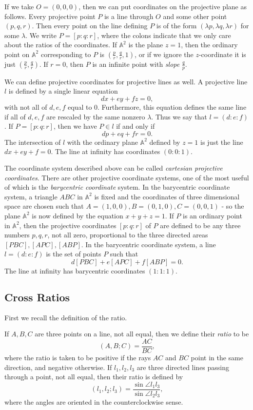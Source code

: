 If we take $O = (0,0,0)$, then we can put coordinates on the projective plane as follows. Every projective point $P$ is a line through $O$ and some other point $(p,q,r)$. Then every point on the line defining $P$ is of the form $(\lambda p,\lambda q,\lambda r)$ for some $\lambda$. We write $P = [p:q:r]$, where the colons indicate that we only care about the ratios of the coordinates. If $\mathbb{A}^2$ is the plane $z=1$, then the ordinary point on $\mathbb{A}^2$ corresponding to $P$ is $(\frac{p}{r},\frac{q}{r},1)$, or if we ignore the $z$-coordinate it is just $(\frac{p}{r},\frac{q}{r})$. If $r = 0$, then $P$ is an infinite point with \emph{slope} $\frac{q}{p}$.

We can define projective coordinates for projective lines as well. A projective line $l$ is defined by a single linear equation
\[
dx+ey+fz = 0,
\]
with not all of $d,e,f$ equal to $0$. Furthermore, this equation defines the same line if all of $d,e,f$ are rescaled by the same nonzero $\lambda$. Thus we say that $l = (d:e:f)$. If $P = [p:q:r]$, then we have $P\in l$ if and only if
\[
dp + eq+ fr = 0.
\]
The intersection of $l$ with the ordinary plane $\mathbb{A}^2$ defined by $z=1$ is just the line $dx+ey+f=0$. The line at infinity has coordinates $(0:0:1)$.

The coordinate system described above can be called \emph{cartesian projective coordinates}. There are other projective coordinate systems, one of the most useful of which is the \emph{barycentric coordinate} system. In the barycentric coordinate system, a triangle $ABC$ in $\mathbb{A}^2$ is fixed and the coordinates of three dimensional space are chosen such that $A=(1,0,0), B = (0,1,0), C = (0,0,1)$ - so the plane $\mathbb{A}^2$ is now defined by the equation $x+y+z = 1$. If $P$ is an ordinary point in $\mathbb{A}^2$, then the projective coordinates $[p:q:r]$ of $P$ are defined to be any three numbers $p,q,r$, not all zero, proportional to the three directed areas $[PBC], [APC], [ABP]$. In the barycentric coordinate system, a line $l=(d:e:f)$ is the set of points $P$ such that
\[
d[PBC] + e[APC] + f[ABP] = 0.
\]
The line at infinity has barycentric coordinates $(1:1:1)$.

\subsection{Cross Ratios}

First we recall the definition of the ratio.

\begin{defn} If $A,B,C$ are three points on a line, not all equal, then we define their \emph{ratio} to be
\[
(A,B;C) = \frac{AC}{BC},
\]
where the ratio is taken to be positive if the rays $AC$ and $BC$ point in the same direction, and negative otherwise.
If $l_1,l_2,l_3$ are three directed lines passing through a point, not all equal, then their ratio is defined by
\[
(l_1,l_2;l_3) = \frac{\sin\angle l_1l_3}{\sin \angle l_2l_3},
\]
where the angles are oriented in the counterclockwise sense.
\end{defn}

